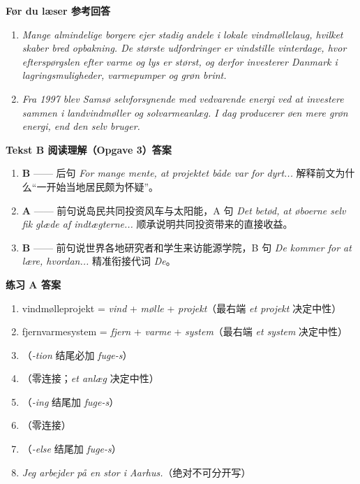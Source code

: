 \begin{answerbox}
\textbf{Før du læser 参考回答}
\begin{enumerate}
  \item \textit{Mange almindelige borgere ejer stadig andele i lokale vindmøllelaug, hvilket skaber bred opbakning. De største udfordringer er vindstille vinterdage, hvor efterspørgslen efter varme og lys er størst, og derfor investerer Danmark i lagringsmuligheder, varmepumper og grøn brint.}
  \item \textit{Fra 1997 blev Samsø selvforsynende med vedvarende energi ved at investere sammen i landvindmøller og solvarmeanlæg. I dag producerer øen mere grøn energi, end den selv bruger.}
\end{enumerate}

\textbf{Tekst B 阅读理解（Opgave 3）答案}
\begin{enumerate}
  \item \textbf{B} —— 后句 \textit{For mange mente, at projektet både var for dyrt...} 解释前文为什么“一开始当地居民颇为怀疑”。
  \item \textbf{A} —— 前句说岛民共同投资风车与太阳能，A 句 \textit{Det betød, at øboerne selv fik glæde af indtægterne...} 顺承说明共同投资带来的直接收益。
  \item \textbf{B} —— 前句说世界各地研究者和学生来访能源学院，B 句 \textit{De kommer for at lære, hvordan...} 精准衔接代词 \textit{De}。
\end{enumerate}

\textbf{练习 A 答案}
\begin{enumerate}
  \item {} vindmølleprojekt = \textit{vind} + \textit{mølle} + \textit{projekt}（最右端 \textit{et projekt} 决定中性）
  \item {} fjernvarmesystem = \textit{fjern} + \textit{varme} + \textit{system}（最右端 \textit{et system} 决定中性）
  \item {}（\textit{-tion} 结尾必加 \textit{fuge-s}）
  \item {}（零连接；\textit{et anlæg} 决定中性）
  \item {}（\textit{-ing} 结尾加 \textit{fuge-s}）
  \item {}（零连接）
  \item {}（\textit{-else} 结尾加 \textit{fuge-s}）
  \item \textit{Jeg arbejder på en stor  i Aarhus.}（绝对不可分开写）
\end{enumerate}


\end{answerbox}
